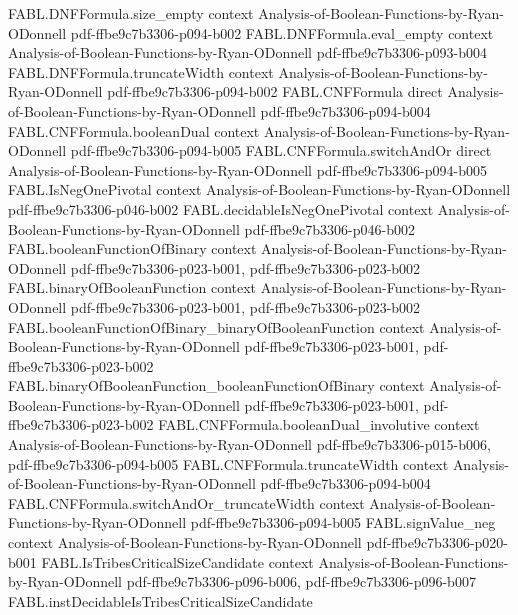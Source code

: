 \begin{theorem}
\proofstep
  {FABL.DNFFormula.size_empty}
  {context}
  {Analysis-of-Boolean-Functions-by-Ryan-ODonnell}
  {pdf-ffbe9c7b3306-p094-b002}
\proofstep
  {FABL.DNFFormula.eval_empty}
  {context}
  {Analysis-of-Boolean-Functions-by-Ryan-ODonnell}
  {pdf-ffbe9c7b3306-p093-b004}
\proofstep
  {FABL.DNFFormula.truncateWidth}
  {context}
  {Analysis-of-Boolean-Functions-by-Ryan-ODonnell}
  {pdf-ffbe9c7b3306-p094-b002}
\proofstep
  {FABL.CNFFormula}
  {direct}
  {Analysis-of-Boolean-Functions-by-Ryan-ODonnell}
  {pdf-ffbe9c7b3306-p094-b004}
\proofstep
  {FABL.CNFFormula.booleanDual}
  {context}
  {Analysis-of-Boolean-Functions-by-Ryan-ODonnell}
  {pdf-ffbe9c7b3306-p094-b005}
\proofstep
  {FABL.CNFFormula.switchAndOr}
  {direct}
  {Analysis-of-Boolean-Functions-by-Ryan-ODonnell}
  {pdf-ffbe9c7b3306-p094-b005}
\proofstep
  {FABL.IsNegOnePivotal}
  {context}
  {Analysis-of-Boolean-Functions-by-Ryan-ODonnell}
  {pdf-ffbe9c7b3306-p046-b002}
\proofstep
  {FABL.decidableIsNegOnePivotal}
  {context}
  {Analysis-of-Boolean-Functions-by-Ryan-ODonnell}
  {pdf-ffbe9c7b3306-p046-b002}
\proofstep
  {FABL.booleanFunctionOfBinary}
  {context}
  {Analysis-of-Boolean-Functions-by-Ryan-ODonnell}
  {pdf-ffbe9c7b3306-p023-b001,
    pdf-ffbe9c7b3306-p023-b002}
\proofstep
  {FABL.binaryOfBooleanFunction}
  {context}
  {Analysis-of-Boolean-Functions-by-Ryan-ODonnell}
  {pdf-ffbe9c7b3306-p023-b001,
    pdf-ffbe9c7b3306-p023-b002}
\proofstep
  {FABL.booleanFunctionOfBinary_binaryOfBooleanFunction}
  {context}
  {Analysis-of-Boolean-Functions-by-Ryan-ODonnell}
  {pdf-ffbe9c7b3306-p023-b001,
    pdf-ffbe9c7b3306-p023-b002}
\proofstep
  {FABL.binaryOfBooleanFunction_booleanFunctionOfBinary}
  {context}
  {Analysis-of-Boolean-Functions-by-Ryan-ODonnell}
  {pdf-ffbe9c7b3306-p023-b001,
    pdf-ffbe9c7b3306-p023-b002}
\proofstep
  {FABL.CNFFormula.booleanDual_involutive}
  {context}
  {Analysis-of-Boolean-Functions-by-Ryan-ODonnell}
  {pdf-ffbe9c7b3306-p015-b006,
    pdf-ffbe9c7b3306-p094-b005}
\proofstep
  {FABL.CNFFormula.truncateWidth}
  {context}
  {Analysis-of-Boolean-Functions-by-Ryan-ODonnell}
  {pdf-ffbe9c7b3306-p094-b004}
\proofstep
  {FABL.CNFFormula.switchAndOr_truncateWidth}
  {context}
  {Analysis-of-Boolean-Functions-by-Ryan-ODonnell}
  {pdf-ffbe9c7b3306-p094-b005}
\proofstep
  {FABL.signValue_neg}
  {context}
  {Analysis-of-Boolean-Functions-by-Ryan-ODonnell}
  {pdf-ffbe9c7b3306-p020-b001}
\proofstep
  {FABL.IsTribesCriticalSizeCandidate}
  {context}
  {Analysis-of-Boolean-Functions-by-Ryan-ODonnell}
  {pdf-ffbe9c7b3306-p096-b006,
    pdf-ffbe9c7b3306-p096-b007}
\proofstep
  {FABL.instDecidableIsTribesCriticalSizeCandidate}

\end{theorem}
